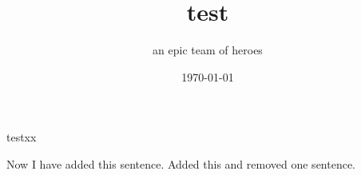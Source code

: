 \documentclass[12pt]{article}
\begin{document}
\title{test}
\author{an epic team of heroes}
\date{\today}
\maketitle

testxx

Now I have added this sentence.  Added this and removed one sentence.
\end{document}
